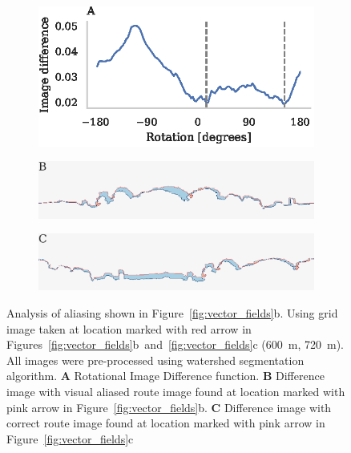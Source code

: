 \documentclass[letterpaper]{article}
\begin{document}
\begin{figure}[t]
    \begin{subfigure}[b]{\columnwidth}
        \includegraphics[width=\columnwidth]{figures/alias_ridf.eps}
    \end{subfigure}
    \begin{subfigure}[b]{\columnwidth}
        \includegraphics[width=\columnwidth]{figures/image_diff_bad.png}
    \end{subfigure}
    \begin{subfigure}[b]{\columnwidth}
        \includegraphics[width=\columnwidth]{figures/image_diff_good.png}
    \end{subfigure}
    \caption{Analysis of aliasing shown in Figure~\ref{fig:vector_fields}b.
    Using grid image taken at location marked with red arrow in Figures~\ref{fig:vector_fields}b~and~\ref{fig:vector_fields}c (\SI{600}{\metre}, \SI{720}{\metre}).
    All images were pre-processed using watershed segmentation algorithm.
    \textbf{A} Rotational Image Difference function.
    \textbf{B} Difference image with visual aliased route image found at location marked with pink arrow in Figure~\ref{fig:vector_fields}b.
    \textbf{C} Difference image with correct route image found at location marked with pink arrow in Figure~\ref{fig:vector_fields}c}
    \label{fig:aliasing}
\end{figure}
\end{document}
